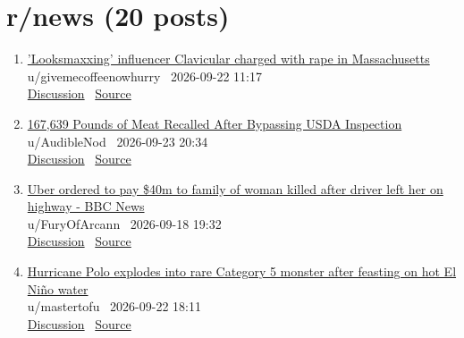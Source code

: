 \documentclass[11pt,a4paper]{article}
\begin{document}
\section*{r/news \normalsize(20 posts)}
\begin{enumerate}
  \item \href{https://www.reddit.com/r/news/comments/1wn6nvg/looksmaxxing_influencer_clavicular_charged_with/}{'Looksmaxxing' influencer Clavicular charged with rape in Massachusetts}\\ {\small u/givemecoffeenowhurry \textbullet\ 2026-09-22 11:17}\\ {\small \href{https://www.reddit.com/r/news/comments/1wn6nvg/looksmaxxing_influencer_clavicular_charged_with/}{Discussion} \textbullet\ \href{https://www.nbcnews.com/news/us-news/clavicular-looksmaxxing-charged-rape-massachusetts-rcna599130}{Source}}
  \item \href{https://www.reddit.com/r/news/comments/1wohg7n/167639_pounds_of_meat_recalled_after_bypassing/}{167,639 Pounds of Meat Recalled After Bypassing USDA Inspection}\\ {\small u/AudibleNod \textbullet\ 2026-09-23 20:34}\\ {\small \href{https://www.reddit.com/r/news/comments/1wohg7n/167639_pounds_of_meat_recalled_after_bypassing/}{Discussion} \textbullet\ \href{https://cobbcountycourier.com/2026/09/167639-pounds-of-meat-recalled-after-bypassing-usda-inspection/}{Source}}
  \item \href{https://www.reddit.com/r/news/comments/1wk002p/uber_ordered_to_pay_40m_to_family_of_woman_killed/}{Uber ordered to pay \$40m to family of woman killed after driver left her on highway - BBC News}\\ {\small u/FuryOfArcann \textbullet\ 2026-09-18 19:32}\\ {\small \href{https://www.reddit.com/r/news/comments/1wk002p/uber_ordered_to_pay_40m_to_family_of_woman_killed/}{Discussion} \textbullet\ \href{https://www.bbc.co.uk/news/articles/cqp8d1gw6l8po?at_medium=RSS&at_campaign=rss}{Source}}
  \item \href{https://www.reddit.com/r/news/comments/1wnh6fb/hurricane_polo_explodes_into_rare_category_5/}{Hurricane Polo explodes into rare Category 5 monster after feasting on hot El Niño water}\\ {\small u/mastertofu \textbullet\ 2026-09-22 18:11}\\ {\small \href{https://www.reddit.com/r/news/comments/1wnh6fb/hurricane_polo_explodes_into_rare_category_5/}{Discussion} \textbullet\ \href{https://www.cnn.com/2026/09/22/weather/hurricane-polo-category-5-mexico-climate}{Source}}

\end{enumerate}
\end{document}

